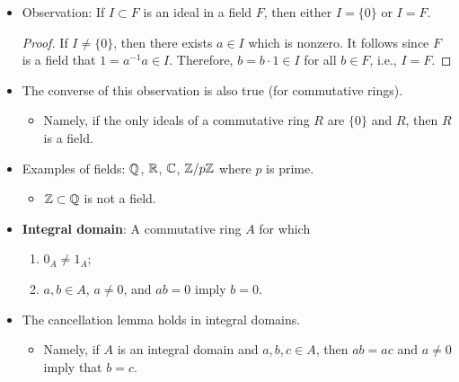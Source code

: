 \documentclass[../notes.tex]{subfiles}
\begin{document}
\begin{itemize}
\begin{enumerate}[label={(\roman*)}]
    \end{enumerate}
    \item Observation: If $I\subset F$ is an ideal in a field $F$, then either $I=\{0\}$ or $I=F$.
    \begin{proof}
        If $I\neq\{0\}$, then there exists $a\in I$ which is nonzero. It follows since $F$ is a field that $1=a^{-1}a\in I$. Therefore, $b=b\cdot 1\in I$ for all $b\in F$, i.e., $I=F$.
    \end{proof}
    \item The converse of this observation is also true (for commutative rings).
    \begin{itemize}
        \item Namely, if the only ideals of a commutative ring $R$ are $\{0\}$ and $R$, then $R$ is a field.
    \end{itemize}
    \item Examples of fields: $\mathbb{Q}$, $\mathbb{R}$, $\mathbb{C}$, $\mathbb{Z}/p\mathbb{Z}$ where $p$ is prime.
    \begin{itemize}
        \item $\mathbb{Z}\subset\mathbb{Q}$ is not a field.
    \end{itemize}
    \item \textbf{Integral domain}: A commutative ring $A$ for which
    \begin{enumerate}
        \item $0_A\neq 1_A$;
        \item $a,b\in A$, $a\neq 0$, and $ab=0$ imply $b=0$.
    \end{enumerate}
    \item The cancellation lemma holds in integral domains.
    \begin{itemize}
        \item Namely, if $A$ is an integral domain and $a,b,c\in A$, then $ab=ac$ and $a\neq 0$ imply that $b=c$.
    \end{itemize}
\end{itemize}
\end{document}
